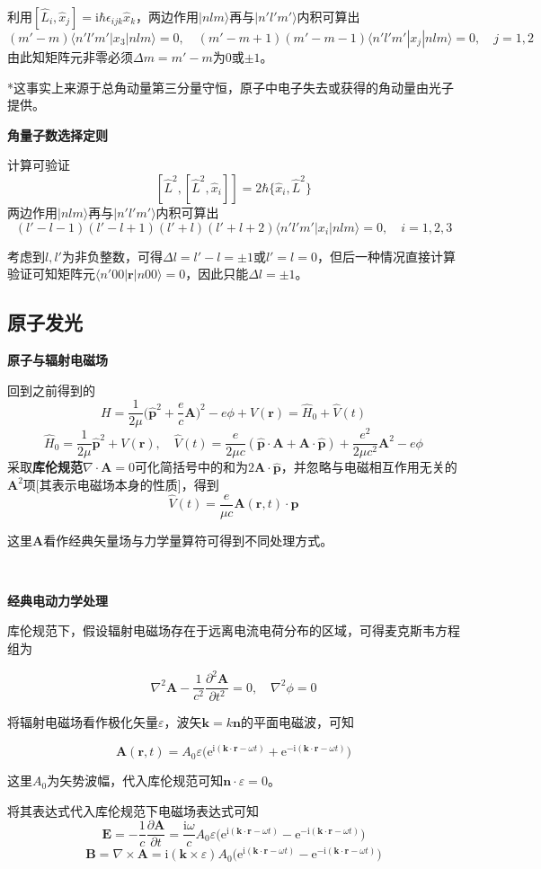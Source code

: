 \documentclass[a4paper,UTF8,fontset=windows]{ctexart}
\newcommand*{\ir}{\mathrm{i}}
\newcommand*{\er}{\mathrm{e}}
\newcommand*{\ket}[1]{|#1\rangle}
\newcommand*{\blk}[3]{\langle#1|#2|#3\rangle}
\newcommand*{\br}{\mathbf{r}}
\newcommand*{\bp}{\mathbf{p}}
\newcommand*{\ba}{\mathbf{A}}
\begin{document}
利用$[\hat{L}_i,\hat{x}_j]=\ir\hbar\epsilon_{ijk}\hat{x}_k$，两边作用$\ket{nlm}$再与$\ket{n'l'm'}$内积可算出
$$(m'-m)\blk{n'l'm'}{x_3}{nlm}=0,\quad(m'-m+1)(m'-m-1)\blk{n'l'm'}{x_j}{nlm}=0,\quad j=1,2$$
由此知矩阵元非零必须$\Delta m=m'-m$为0或$\pm 1$。

*这事实上来源于总角动量第三分量守恒，原子中电子失去或获得的角动量由光子提供。

\textbf{角量子数选择定则}

计算可验证
$$[\hat{L}^2,[\hat{L}^2,\hat{x}_i]]=2\hbar\{\hat{x}_i,\hat{L}^2\}$$
两边作用$\ket{nlm}$再与$\ket{n'l'm'}$内积可算出
$$(l'-l-1)(l'-l+1)(l'+l)(l'+l+2)\blk{n'l'm'}{x_i}{nlm}=0,\quad i=1,2,3$$

考虑到$l,l'$为非负整数，可得$\Delta l=l'-l=\pm 1$或$l'=l=0$，但后一种情况直接计算验证可知矩阵元$\blk{n'00}{\br}{n00}=0$，因此只能$\Delta l=\pm 1$。


\subsection{原子发光}
\textbf{原子与辐射电磁场}

回到之前得到的
$$H=\frac{1}{2\mu}\bigg(\hat{\bp}^2+\frac{e}{c}\ba\bigg)^2-e\phi+V(\br)=\hat{H}_0+\hat{V}(t)$$
$$\hat{H}_0=\frac{1}{2\mu}\hat{\bp}^2+V(\br),\quad\hat{V}(t)=\frac{e}{2\mu c}(\hat{\bp}\cdot\ba+\ba\cdot\hat{\bp})+\frac{e^2}{2\mu c^2}\ba^2-e\phi$$
采取\textbf{库伦规范}$\nabla\cdot\ba=0$可化简括号中的和为$2\ba\cdot\hat{\bp}$，并忽略与电磁相互作用无关的$\ba^2$项[其表示电磁场本身的性质]，得到
$$\hat{V}(t)=\frac{e}{\mu c}\ba(\br,t)\cdot\hat{\bp}$$

这里$\ba$看作经典矢量场与力学量算符可得到不同处理方式。

\

\textbf{经典电动力学处理}

库伦规范下，假设辐射电磁场存在于远离电流电荷分布的区域，可得麦克斯韦方程组为

$$\nabla^2\ba-\frac{1}{c^2}\frac{\partial^2\ba}{\partial t^2}=0,\quad\nabla^2\phi=0$$

将辐射电磁场看作极化矢量$\varepsilon$，波矢$\mathbf{k}=k\mathbf{n}$的平面电磁波，可知

$$\ba(\br,t)=A_0\varepsilon\big(\er^{\ir(\mathbf{k}\cdot\br-\omega t)}+\er^{-\ir(\mathbf{k}\cdot\br-\omega t)}\big)$$

这里$A_0$为矢势波幅，代入库伦规范可知$\mathbf{n}\cdot\varepsilon=0$。

将其表达式代入库伦规范下电磁场表达式可知
$$\mathbf{E}=-\frac{1}{c}\frac{\partial\ba}{\partial t}=\frac{\ir\omega}{c}A_0\varepsilon\big(\er^{\ir(\mathbf{k}\cdot\br-\omega t)}-\er^{-\ir(\mathbf{k}\cdot\br-\omega t)}\big)$$
$$\mathbf{B}=\nabla\times\ba=\ir(\mathbf{k}\times\varepsilon)A_0\big(\er^{\ir(\mathbf{k}\cdot\br-\omega t)}-\er^{-\ir(\mathbf{k}\cdot\br-\omega t)}\big)$$
\end{document}
